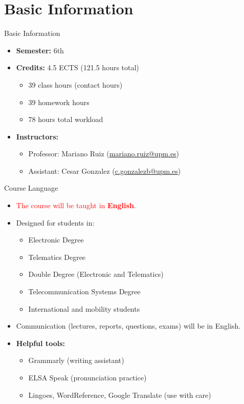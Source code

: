 \section{Basic Information}
\begin{frame}{Basic Information}
  \begin{itemize}
    \item \textbf{Semester:} 6th
    \item \textbf{Credits:} 4.5 ECTS (121.5 hours total)
    \begin{itemize}
      \item 39 class hours (contact hours)
      \item 39 homework hours
      \item 78 hours total workload
    \end{itemize}
    \item \textbf{Instructors:}
    \begin{itemize}
      \item Professor: Mariano Ruiz (\href{mailto:mariano.ruiz@upm.es}{mariano.ruiz@upm.es})
      \item Assistant: Cesar Gonzalez (\href{mailto:c.gonzalezb@upm.es}{c.gonzalezb@upm.es})
    \end{itemize}
  \end{itemize}
\end{frame}


\begin{frame}{Course Language}
  \begin{itemize}
    \item \textcolor{red}{The course will be taught in \textbf{English}}.
    \item Designed for students in:
    \begin{itemize}
      \item Electronic Degree
      \item Telematics Degree
      \item Double Degree (Electronic and Telematics)
      \item Telecommunication Systems Degree
      \item International and mobility students
    \end{itemize}
    \item Communication (lectures, reports, questions, exams) will be in English.
    \item \textbf{Helpful tools:}
    \begin{itemize}
      \item Grammarly (writing assistant)
      \item ELSA Speak (pronunciation practice)
      \item Lingoes, WordReference, Google Translate (use with care)
    \end{itemize}
  \end{itemize}
\end{frame}

